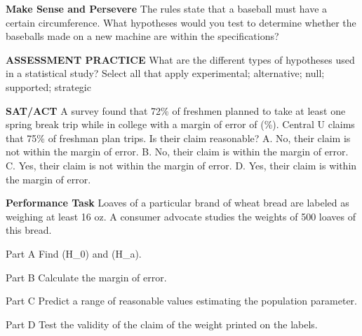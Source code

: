 \documentclass{article}
\newenvironment{practice}[2]{}{}        %
\newcommand{\answer}[1]{}               %
\newcommand{\placeholder}[2]{}          %
\newcommand{\te}[1]{}                   %
\begin{document}
\begin{practice}{18}{2}
\textbf{Make Sense and Persevere} The rules state that a baseball must have a certain circumference. What hypotheses would you test to determine whether the baseballs made on a new machine are within the specifications?
\placeholder{illustration}{Baseball with red stitching in a brown glove. Callout: Circumference within 3 mm of 232 mm.}
\answer{(H_0): The circumferences of the baseballs have a mean (\mu) such that (229\text{ mm}\leq\mu\leq235\text{ mm}); (H_a): circumferences of the baseballs have a mean (\mu) such that (\mu<229\text{ mm}) or (\mu>235\text{ mm}).}
\end{practice}
\begin{practice}{19}{1}
\textbf{ASSESSMENT PRACTICE} What are the different types of hypotheses used in a statistical study? Select all that apply
experimental; alternative; null; supported; strategic
\answer{alternative; null}
\end{practice}
\begin{practice}{20}{2}
\textbf{SAT/ACT} A survey found that 72\% of freshmen planned to take at least one spring break trip while in college with a margin of error of (\%). Central U claims that 75\% of freshman plan trips. Is their claim reasonable?
A. No, their claim is not within the margin of error.
B. No, their claim is within the margin of error.
C. Yes, their claim is not within the margin of error.
D. Yes, their claim is within the margin of error.
\answer{D}
\end{practice}
\begin{practice}{21}{3}
\textbf{Performance Task} Loaves of a particular brand of wheat bread are labeled as weighing at least 16 oz. A consumer advocate studies the weights of 500 loaves of this bread.
\placeholder{illustration}{Brown sliced loaf of wheat bread with three slices in front. Callout x-bar=15.6 oz; sigma-bar=0.8 oz.}
\te{Printed a bar over sigma in the callout; the margin calculation treats 0.8 as the population standard deviation.}
Part A Find (H_0) and (H_a).
\answer{Part A (H_0:\mu\geq16\text{ ounces}); (H_a:\mu<16\text{ ounces})}
Part B Calculate the margin of error.
\answer{Part B (m=0.07)}
Part C Predict a range of reasonable values estimating the population parameter.
\answer{Part C (15.53\leq\mu\leq15.67)}
Part D Test the validity of the claim of the weight printed on the labels.
\answer{Part D The mean weight of 16 ounces claimed by the bread company is outside the range of reasonable means, so the evidence does not support their claim.}
\end{practice}
\end{document}
